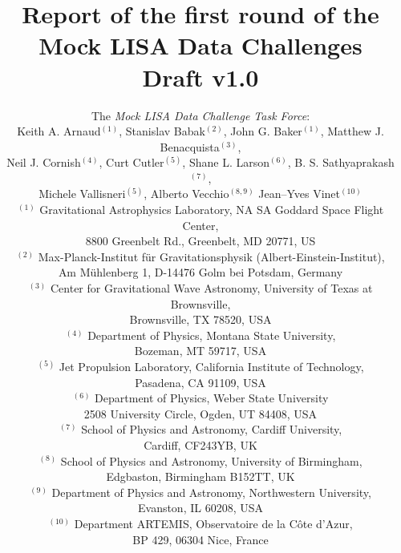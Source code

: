 \documentclass[11pt]{article}
\begin{document}
\title{\bf Report of the first round of the Mock LISA Data Challenges\\ [10pt]
\small{ Draft v1.0}}

\author{The \emph{Mock LISA Data Challenge Task Force}: \\ [5pt]
Keith A. Arnaud$^{(1)}$,
Stanislav Babak$^{(2)}$,
John G. Baker$^{(1)}$,
Matthew J. Benacquista$^{(3)}$, \\
Neil J. Cornish$^{(4)}$,
Curt Cutler$^{(5)}$,
Shane L. Larson$^{(6)}$,
B. S. Sathyaprakash$^{(7)}$, \\
Michele Vallisneri$^{(5)}$,
Alberto Vecchio$^{(8,9)}$
Jean--Yves Vinet$^{(10)}$\\ [20pt]
\small $^{(1)}$ Gravitational Astrophysics Laboratory, NA SA Goddard Space Flight Center, \\ 
\small 8800 Greenbelt Rd., Greenbelt, MD 20771, US \\
\small $^{(2)}$ Max-Planck-Institut f\"ur Gravitationsphysik (Albert-Einstein-Institut), \\ 
\small Am M\"uhlenberg 1, D-14476 Golm bei Potsdam, Germany \\
\small $^{(3)}$ Center for Gravitational Wave Astronomy, University of Texas at Brownsville, \\ 
\small Brownsville, TX 78520, USA \\
\small $^{(4)}$ Department of Physics, Montana State University, \\
\small Bozeman, MT 59717, USA \\ 
\small $^{(5)}$ Jet Propulsion Laboratory, California Institute of Technology, \\ 
\small Pasadena, CA 91109, USA \\
\small $^{(6)}$ Department of Physics, Weber State University \\
\small 2508 University Circle, Ogden, UT 84408, USA \\ 
\small $^{(7)}$ School of Physics and Astronomy, Cardiff University, \\ 
\small Cardiff, CF243YB, UK \\
\small $^{(8)}$ School of Physics and Astronomy, University of Birmingham, \\ 
\small Edgbaston, Birmingham B152TT, UK \\
\small $^{(9)}$ Department of Physics and Astronomy, Northwestern University, \\ 
\small Evanston, IL 60208, USA \\
\small $^{(10)}$ Department ARTEMIS, Observatoire de la C\^ote d'Azur, \\ 
\small BP 429, 06304 Nice, France \\ [20pt]
}
\end{document}
